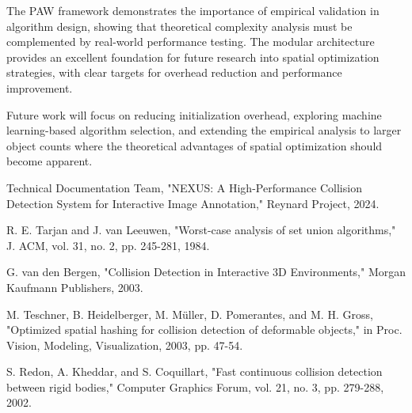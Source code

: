 \documentclass[10pt]{article}
\begin{document}
The PAW framework demonstrates the importance of empirical validation in algorithm design, showing that theoretical complexity analysis must be complemented by real-world performance testing. The modular architecture provides an excellent foundation for future research into spatial optimization strategies, with clear targets for overhead reduction and performance improvement.

Future work will focus on reducing initialization overhead, exploring machine learning-based algorithm selection, and extending the empirical analysis to larger object counts where the theoretical advantages of spatial optimization should become apparent.


\begin{thebibliography}{99}
 Technical Documentation Team, "NEXUS: A High-Performance Collision Detection System for Interactive Image Annotation," Reynard Project, 2024.

 R. E. Tarjan and J. van Leeuwen, "Worst-case analysis of set union algorithms," J. ACM, vol. 31, no. 2, pp. 245-281, 1984.

 G. van den Bergen, "Collision Detection in Interactive 3D Environments," Morgan Kaufmann Publishers, 2003.

 M. Teschner, B. Heidelberger, M. Müller, D. Pomerantes, and M. H. Gross, "Optimized spatial hashing for collision detection of deformable objects," in Proc. Vision, Modeling, Visualization, 2003, pp. 47-54.

 S. Redon, A. Kheddar, and S. Coquillart, "Fast continuous collision detection between rigid bodies," Computer Graphics Forum, vol. 21, no. 3, pp. 279-288, 2002.

\end{thebibliography}
\end{document}
